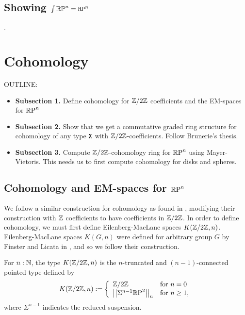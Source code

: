 \documentclass{amsart}
\begin{document}
\subsection{Showing $ \int \mathbb{RP}^n = \mathtt{RP}^n $}.


\section{Cohomology}
\label{sec:cohom}

OUTLINE:
\begin{itemize}
\item 
  \textbf{Subsection 1.} 
  Define cohomology for $ \mathbb{Z}/2\mathbb{Z} $ coefficients and the
  EM-spaces for $ \mathbb{R}\textrm{P}^n $
\item
  \textbf{Subsection 2.} Show that we get a commutative
  graded ring structure for cohomology of any type $ \mathtt{X} $
  with $ \mathbb{Z}/2\mathbb{Z} $-coefficients. Follow Brunerie's thesis.
\item
  \textbf{Subsection 3.} Compute $ \mathbb{Z}/2\mathbb{Z} $-cohomology ring
  for $ \mathbb{R}\textrm{P}^n $ using Mayer-Vietoris.  This needs us to
  first compute cohomology for disks and spheres.  
\end{itemize}


\subsection{Cohomology and EM-spaces for $\mathbb{R}\textrm{P}^n$}


We follow a similar construction for cohomology as found in \cite{brunerie:thesis}, modifying their construction with $\mathbb{Z}$ coefficients to have coefficients in $\mathbb{Z}/2\mathbb{Z}$. In order to define cohomology, we must first define Eilenberg-MacLane spaces $K(\mathbb{Z}/2\mathbb{Z},n)$. Eilenberg-MacLane spaces $K(G,n)$ were defined for arbitrary group $G$ by Finster and Licata in \cite{fl:em}, and so we follow their construction. 

\begin{definition}
	For $n:\mathbb{N}$, the type  $K(\mathbb{Z}/2\mathbb{Z},n)$ is the $n$-truncated and $(n-1)$-connected pointed type defined by
	\[ K(\mathbb{Z}/2\mathbb{Z},n):=\left\{ \begin{array}{ll} \mathbb{Z}/2\mathbb{Z} & \text{for }n=0\\
	\left| \left| \Sigma^{n-1}\mathbb{R}\textrm{P}^2\right| \right|_n & \text{for } n\ge 1, 
	\end{array}\right.\]
	where $\Sigma^{n-1}$ indicates the reduced suspension. 
\end{definition}
\end{document}
